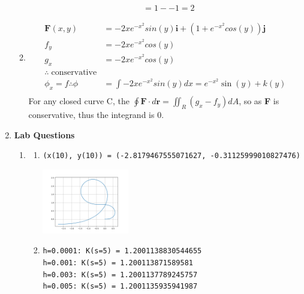 \documentclass[11pt]{article}
\begin{document}
\begin{preview}
\begin{enumerate}
\begin{enumerate}
\begin{align*}
                                                               & = 1 - -1 = 2
                  \end{align*}
            \item 
            \begin{align*}
                  \textbf{F}(x,y) &= -2xe^{-x^2}sin(y)\textbf{i} + (1+e^{-x^2}cos(y))\textbf{j} \\
                  f_y &= -2xe^{-x^2}cos(y) \\
                  g_x &= -2xe^{-x^2}cos(y) \\
                  \therefore \; \mathrm{conservative} \\
                  \phi_x = f \therefore \phi &= \int -2xe^{-x^2}sin(y) dx = e^{-x^2}\sin \left(y\right)+k(y)\\
            \end{align*}
            For any closed curve C, the $\oint \textbf{F}{\cdot}d \textbf{r} = \iint_R (g_x - f _y) dA$, so as \textbf{F} is conservative, thus the integrand is 0. 
          \end{enumerate}
    \item \textbf{Lab Questions}
          \begin{enumerate}
            \item
                  \begin{enumerate}
                    \item \texttt{(x(10), y(10)) = (-2.8179467555071627, -0.31125999010827476)}
                          \begin{center}
                            \includegraphics[width=0.33\textwidth]{inc/q4ai.png}
                          \end{center}
                    \item
                          \texttt{h=0.0001: K(s=5) = 1.2001138830544655} \\
                          \texttt{h=0.001: K(s=5) = 1.200113871589581} \\
                          \texttt{h=0.003: K(s=5) = 1.2001137789245757} \\
                          \texttt{h=0.005: K(s=5) = 1.2001135935941987} \\

\end{enumerate}
\end{enumerate}
\end{enumerate}
\end{preview}
\end{document}
